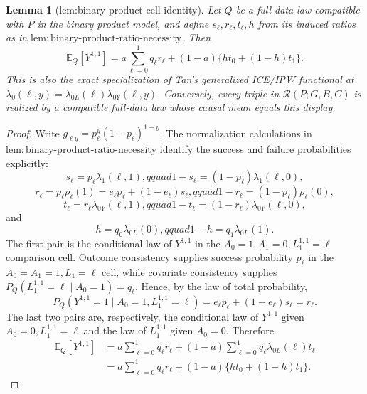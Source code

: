 \documentclass{article}
\newtheorem{lemma}{Lemma}
\begin{document}
\begin{lemma}[lem:binary-product-cell-identity]\label{lem:binary-product-cell-identity}
Let \(Q\) be a full-data law compatible with \(P\) in the binary product model, and define \(s_\ell,r_\ell,t_\ell,h\) from its induced ratios as in \(\mathrm{lem{:}binary\text{-}product\text{-}ratio\text{-}necessity}\). Then
\[
\mathbb E_Q[Y^{1,1}]
=a\sum_{\ell=0}^1q_\ell r_\ell
 +(1-a)\{h t_0+(1-h)t_1\}.
\]
This is also the exact specialization of Tan's generalized ICE/IPW functional at \(\lambda_0(\ell,y)=\lambda_{0L}(\ell)\lambda_{0Y}(\ell,y)\). Conversely, every triple in \(\mathcal R(P;G,B,C)\) is realized by a compatible full-data law whose causal mean equals this display.
\end{lemma}
\begin{proof}
Write \(g_{\ell y}=p_\ell^y(1-p_\ell)^{1-y}\). The normalization calculations in \(\mathrm{lem{:}binary\text{-}product\text{-}ratio\text{-}necessity}\) identify the success and failure probabilities explicitly:
\[
s_\ell=p_\ell\lambda_1(\ell,1),qquad
1-s_\ell=(1-p_\ell)\lambda_1(\ell,0),
\]
\[
r_\ell=p_\ell\rho_\ell(1)
=e_\ell p_\ell+(1-e_\ell)s_\ell,qquad
1-r_\ell=(1-p_\ell)\rho_\ell(0),
\]
\[
t_\ell=r_\ell\lambda_{0Y}(\ell,1),qquad
1-t_\ell=(1-r_\ell)\lambda_{0Y}(\ell,0),
\]
and
\[
h=q_0\lambda_{0L}(0),qquad 1-h=q_1\lambda_{0L}(1).
\]
The first pair is the conditional law of \(Y^{1,1}\) in the \(A_0=1,A_1=0,L_1^{1,1}=\ell\) comparison cell. Outcome consistency supplies success probability \(p_\ell\) in the \(A_0=A_1=1,L_1=\ell\) cell, while covariate consistency supplies \(P_Q(L_1^{1,1}=\ell\mid A_0=1)=q_\ell\). Hence, by the law of total probability,
\[
P_Q(Y^{1,1}=1\mid A_0=1,L_1^{1,1}=\ell)
=e_\ell p_\ell+(1-e_\ell)s_\ell=r_\ell.
\]
The last two pairs are, respectively, the conditional law of \(Y^{1,1}\) given \(A_0=0,L_1^{1,1}=\ell\) and the law of \(L_1^{1,1}\) given \(A_0=0\). Therefore
\[
\begin{aligned}
\mathbb E_Q[Y^{1,1}]
&=a\sum_{\ell=0}^1q_\ell r_\ell
 +(1-a)\sum_{\ell=0}^1q_\ell\lambda_{0L}(\ell)t_\ell\\
&=a\sum_{\ell=0}^1q_\ell r_\ell
 +(1-a)\{h t_0+(1-h)t_1\}.
\end{aligned}
\]


\end{proof}
\end{document}
